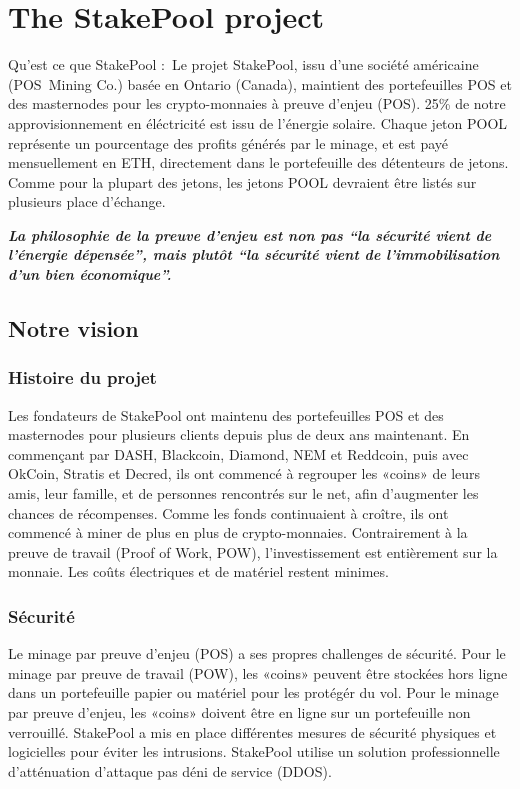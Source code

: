 \section{The StakePool project}

Qu'est ce que StakePool : Le projet StakePool, issu d'une société américaine (POS Mining Co.) basée en Ontario (Canada), maintient des portefeuilles POS et des masternodes pour les crypto-monnaies à preuve d'enjeu (POS). 25\% de notre approvisionnement en éléctricité est issu de l'énergie solaire. Chaque jeton POOL représente un pourcentage des profits générés par le minage, et est payé mensuellement en ETH, directement dans le portefeuille des détenteurs de jetons. Comme pour la plupart des jetons, les jetons POOL devraient être listés sur plusieurs place d'échange.

\textbf{\emph{La philosophie de la preuve d'enjeu est non pas ``la sécurité vient de l'énergie dépensée'', mais plutôt ``la sécurité vient de l'immobilisation d'un bien économique''.}}  \cite{vbuterinposphi}

 \subsection{Notre vision}
  \subsubsection{Histoire du projet}
Les fondateurs de StakePool ont maintenu des portefeuilles POS et des masternodes pour plusieurs clients depuis plus de deux ans maintenant. En commençant par DASH, Blackcoin, Diamond, NEM et Reddcoin, puis avec OkCoin, Stratis et Decred, ils ont commencé à regrouper les «coins» de leurs amis, leur famille, et de personnes rencontrés sur le net, afin d'augmenter les chances de récompenses. Comme les fonds continuaient à croître, ils ont commencé à miner de plus en plus de crypto-monnaies. Contrairement à la preuve de travail (Proof of Work, POW), l'investissement est entièrement sur la monnaie. Les coûts électriques et de matériel restent minimes.

  \subsubsection{Sécurité}
Le minage par preuve d'enjeu (POS) a ses propres challenges de sécurité. Pour le minage par preuve de travail (POW), les «coins» peuvent être stockées hors ligne dans un portefeuille papier ou matériel pour les protégér du vol. Pour le minage par preuve d'enjeu, les «coins» doivent être en ligne sur un portefeuille non verrouillé. StakePool a mis en place différentes mesures de sécurité physiques et logicielles pour éviter les intrusions. StakePool utilise un solution professionnelle d'atténuation d'attaque pas déni de service (DDOS).
  
